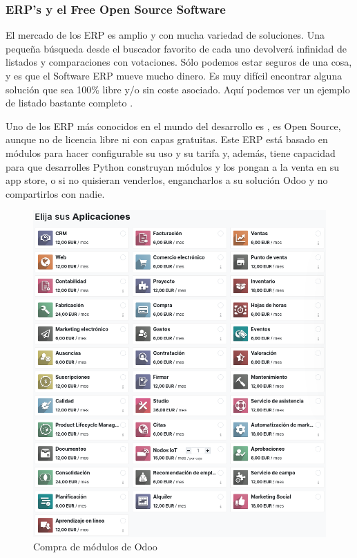 \subsubsection{ERP's y el Free Open Source Software}
El mercado de los ERP es amplio y con mucha variedad de soluciones. Una pequeña búsqueda desde el buscador favorito de cada uno devolverá infinidad de listados y comparaciones con votaciones. Sólo podemos estar seguros de una cosa, y es que el Software ERP mueve mucho dinero. Es muy difícil encontrar alguna solución que sea 100\% libre y/o sin coste asociado. Aquí podemos ver un ejemplo de listado bastante completo \citep{15FreeERP}.
\vspace{1em}
\par Uno de los ERP más conocidos en el mundo del desarrollo es \citep{odooWebpage}, es Open Source, aunque no de licencia libre ni con capas gratuitas. Este ERP está basado en módulos para hacer configurable su uso y su tarifa y, además, tiene capacidad para que desarrolles Python construyan módulos y los pongan a la venta en su app store, o si no quisieran venderlos, engancharlos a su solución Odoo y no compartirlos con nadie.
\begin{figure}[h]
\centering
\includegraphics[scale=0.4]{archivos/odooModules.png}
\caption{Compra de módulos de Odoo}
\label{fig:odooModules_compra}
\end{figure}
